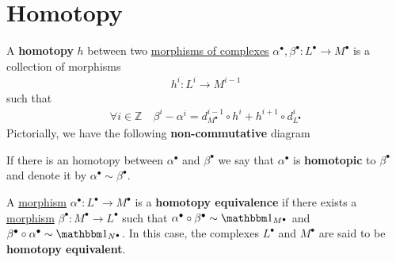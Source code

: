 \documentclass[../../../main]{subfiles}
\begin{document}
\section{Homotopy}

\begin{definition} \label{def:homotopy}
  A \textbf{homotopy} \(h\) between two \hyperref[def:complex-morphism]{morphisms of complexes} \(\alpha^{\bullet}, \beta^{\bullet}: L^{\bullet} \to M^{\bullet}\) is a collection of morphisms
  \begin{align*}
    h^{i}: L^{i} \to M^{i-1}
  \end{align*}
  such that
  \begin{align*}
    \forall i \in \mathbb{Z} \quad \beta^{i} - \alpha^{i} = d_{M^{\bullet}}^{i-1} \circ h^{i} + h^{i+1} \circ d_{L^{\bullet}}^{i}
  \end{align*}
  Pictorially, we have the following \textbf{non-commutative} diagram
  \begin{center}
  \end{center}

  If there is an homotopy between \(\alpha^{\bullet}\) and \(\beta^{\bullet}\) we say that \(\alpha^{\bullet}\) is \textbf{homotopic} to \(\beta^{\bullet}\) and denote it by \(\alpha^{\bullet} \sim \beta^{\bullet}\).
\end{definition}

\begin{definition} \label{def:homotopy-equivalence}
  A \hyperref[def:complex-morphism]{morphism} \(\alpha^{\bullet}: L^{\bullet} \to M^{\bullet}\) is a \textbf{homotopy equivalence} if there exists a \hyperref[def:complex-morphism]{morphism} \(\beta^{\bullet}: M^{\bullet} \to L^{\bullet}\) such that \(\alpha^{\bullet} \circ \beta^{\bullet} \sim \id_{M^{\bullet}}\) and \(\beta^{\bullet} \circ \alpha^{\bullet} \sim \id_{N^{\bullet}}\).
  In this case, the complexes \(L^{\bullet}\) and \(M^{\bullet}\) are said to be \textbf{homotopy equivalent}.
\end{definition}
\end{document}
